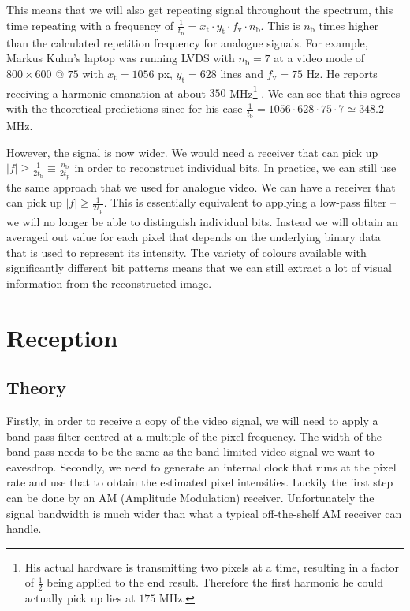 \documentclass[a4paper,12pt,twoside,openright]{report}
\begin{document}
This means that we will also get repeating signal throughout the spectrum, this time repeating with a frequency of $\frac{1}{t_\text{b}} = x_\text{t} \cdot y_\text{t} \cdot f_\text{v} \cdot n_\text{b}$. This is $n_\text{b}$ times higher than the calculated repetition frequency for analogue signals. For example, Markus Kuhn's laptop was running LVDS with $n_\text{b}=7$ at a video mode of $800 \times 600 $ @ $ 75$ with $x_\text{t} = 1056$ px, $y_\text{t} = 628$ lines and $f_\text{v} = 75$ Hz. He reports receiving a harmonic emanation at about $350$ MHz\footnote{His actual hardware is transmitting two pixels at a time, resulting in a factor of $\frac{1}{2}$ being applied to the end result. Therefore the first harmonic he could actually pick up lies at $175$ MHz.} \cite{kuhn2005electromagnetic}. We can see that this agrees with the theoretical predictions since for his case $\frac{1}{t_\text{b}} = 1056 \cdot 628 \cdot 75 \cdot 7 \simeq 348.2$ MHz.

However, the signal is now wider. We would need a receiver that can pick up $|f| \geq \frac{1}{2 t_\text{b}} \equiv \frac{n_\text{b}}{2 t_\text{p}}$ in order to reconstruct individual bits. In practice, we can still use the same approach that we used for analogue video. We can have a receiver that can pick up $|f| \geq \frac{1}{2 t_\text{p}}$. This is essentially equivalent to applying a low-pass filter -- we will no longer be able to distinguish individual bits. Instead we will obtain an averaged out value for each pixel that depends on the underlying binary data that is used to represent its intensity. The variety of colours available with significantly different bit patterns means that we can still extract a lot of visual information from the reconstructed image.

\section{Reception}

\subsection{Theory}
Firstly, in order to receive a copy of the video signal, we will need to apply a band-pass filter centred at a multiple of the pixel frequency. The width of the band-pass needs to be the same as the band limited video signal we want to eavesdrop. Secondly, we need to generate an internal clock that runs at the pixel rate and use that to obtain the estimated pixel intensities. Luckily the first step can be done by an AM (Amplitude Modulation) receiver. Unfortunately the signal bandwidth is much wider than what a typical off-the-shelf AM receiver can handle.
\end{document}
